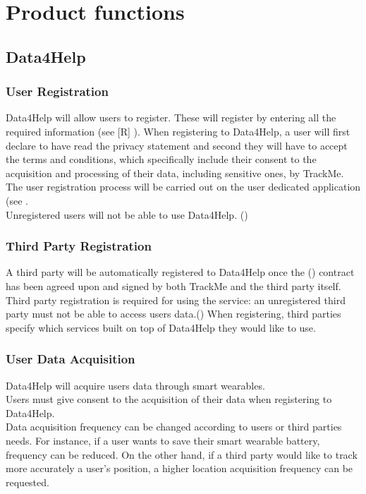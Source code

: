 \documentclass[../../rasd.tex]{subfiles}
\begin{document}
\section{Product functions}
			\subsection{Data4Help}
			
				\subsubsection{User Registration}
				Data4Help will allow users to register. These will register by entering all the required information (see [R] ). When registering to Data4Help, a user will first declare to have read the privacy statement and second they will have to accept the terms and conditions, which specifically include their consent to the acquisition and processing of their data, including sensitive ones, by TrackMe.\\
				The user registration process will be carried out on the user dedicated application (see .\\
				Unregistered users will not be able to use Data4Help. ()
			
				\subsubsection{Third Party Registration}
				A third party will be automatically registered to Data4Help once the () contract has been agreed upon and signed by both TrackMe and the third party itself.\\
				Third party registration is required for using the service: an unregistered third party must not be able to access users data.()
				When registering, third parties specify which services built on top of Data4Help they would like to use.
			
				\subsubsection{User Data Acquisition}
				Data4Help will acquire users data through smart wearables. \\
				Users must give consent to the acquisition of their data when registering to Data4Help.\\
				Data acquisition frequency can be changed according to users or third parties needs. For instance, if a user wants to save their smart wearable battery, frequency can be reduced. On the other hand, if a third party would like to track more accurately a user's position, a higher location acquisition frequency can be requested.	
\end{document}
